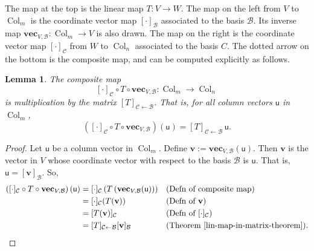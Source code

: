 \documentclass[a4paper,11pt]{book}
\newtheorem{lemma}[theorem]{Lemma}
\theoremstyle{definition}
\newcommand{\ve}[1]{\mathbf{#1}}
\newcommand{\mat}[1]{\mathsf{#1}}
\newcommand{\basis}[1]{{\mathcal #1}}
\DeclareMathOperator{\Col}{Col}
\begin{document}
The map at the top is the linear map $T : V \rightarrow W$. The map on the left from $V$ to $\Col_m$ is the coordinate vector map $[ \cdot ]_\basis{B}$ associated to the basis $\basis{B}$. Its inverse map $\ve{vec}_{V, \basis{B}} : \Col_m \rightarrow V$ is also drawn. The map on the right is the coordinate vector map $[ \cdot]_\basis{C}$ from $W$ to $\Col_n$ associated to the basis $C$. The dotted arrow on the bottom is the composite map, and can be computed explicitly as follows. 
\begin{lemma} The composite map
\[
[\cdot]_\basis{C} \circ T \circ \ve{vec}_{V, \basis{B}} : \Col_m \rightarrow \Col_n 
\]
is multiplication by the matrix $[T]_{\basis{C} \leftarrow \basis{B}}$. That is, for all column vectors $\mat{u}$ in $\Col_m$,
\[
 \left( [\cdot]_\basis{C} \circ T \circ \ve{vec}_{V, \basis{B}} \right) (\mat{u}) = [T]_{\basis{C} \leftarrow \basis{B}} \, \mat{u}.
\]
\end{lemma}
\begin{proof} Let $\mat{u}$ be a column vector in $\Col_m$. Define $\ve{v} := \ve{vec}_{V, \basis{B}} (\mat{u})$. Then $\ve{v}$ is the vector in $V$ whose coordinate vector with respect to the basis $\basis{B}$ is $\mat{u}$. That is, $\mat{u} = [\ve{v}]_\basis{B}$.  So,
\begin{align*}
 \left( [\cdot]_\basis{C} \circ T \circ \ve{vec}_{V, \basis{B}} \right) (\mat{u})  &= [ \cdot ]_\basis{C} \left( T \left(\ve{vec}_{V, \basis{B}}(\mat{u})\right)\right) && \mbox{(Defn of composite map)} \\
 &= [\cdot]_\basis{C} (T(\ve{v})) && \mbox{(Defn of $\ve{v}$)} \\
 &= [T(\ve{v})]_\basis{C} && \mbox{(Defn of $[\cdot]_\basis{C}$)} \\
 &= [T]_{\basis{C} \leftarrow \basis{B}} [\ve{v}]_\basis{B} && \mbox{(Theorem \ref{lin-map-in-matrix-theorem})} .
\end{align*}

\end{proof}
\end{document}
